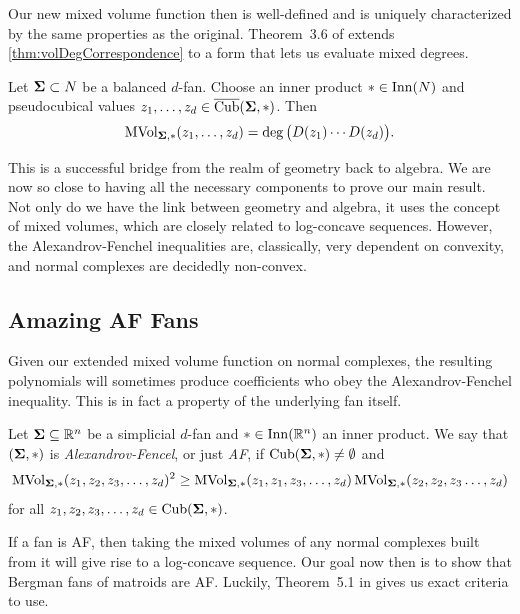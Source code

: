 \documentclass[12pt,oneside]{../../sfsuthesis}
\begin{document}
Our new mixed volume function then is well-defined and is uniquely characterized by the same properties as the original.
Theorem~3.6 of \cite{nowakMixedVolumesNormal2023} extends \th\ref{thm:volDegCorrespondence} to a form that lets us evaluate mixed degrees.
\begin{theorem}\th\label{thm:mixedDeg}
    Let \( \bm{\Sigma} \subset N \) be a balanced \( d \)-fan.
    Choose an inner product \( \ast \in \operatorname{Inn}(N) \) and pseudocubical values \( z_1, \dots, z_d \in \operatorname{\overline{Cub}}( \bm{\Sigma}, \ast ) \).
    Then
    \[
        \operatorname{MVol}_{\bm{\Sigma}, \ast}(z_1, \dots, z_d) = \deg\big( D(z_1) \cdots D(z_d) \big).
    \]
\end{theorem}
This is a successful bridge from the realm of geometry back to algebra.
We are now so close to having all the necessary components to prove our main result.
Not only do we have the link between geometry and algebra, it uses the concept of mixed volumes, which are closely related to log-concave sequences.
However, the Alexandrov-Fenchel inequalities are, classically, very dependent on convexity, and normal complexes are decidedly non-convex.

\subsection{Amazing AF Fans}
Given our extended mixed volume function on normal complexes, the resulting polynomials will sometimes produce coefficients who obey the Alexandrov-Fenchel inequality.
This is in fact a property of the underlying fan itself.
\begin{definition}\th\label{def:AF}
    Let \( \bm{\Sigma} \subseteq \mathbb{R}^n \) be a simplicial \( d \)-fan and \( \ast \in \operatorname{Inn}(\mathbb{R}^n) \) an inner product.
    We say that \( (\bm{\Sigma}, \ast) \) is \emph{Alexandrov-Fencel}, or just \emph{AF}, if \( \operatorname{Cub}(\bm{\Sigma}, \ast) \neq \emptyset \) and
    \[
        \operatorname{MVol}_{\bm{\Sigma}, \ast}(z_1, z_2, z_3, \dots, z_d)^2 \geq  \operatorname{MVol}_{\bm{\Sigma}, \ast}(z_1, z_1, z_3, \dots, z_d)\operatorname{MVol}_{\bm{\Sigma}, \ast}(z_2, z_2, z_3 \dots, z_d)
    \]
    for all \( z_1, z_2, z_3, \dots, z_d \in \operatorname{Cub}(\bm{\Sigma}, \ast) \).
\end{definition}
If a fan is AF, then taking the mixed volumes of any normal complexes built from it will give rise to a log-concave sequence.
Our goal now then is to show that Bergman fans of matroids are AF\@.
Luckily, Theorem~5.1 in \cite{nowakMixedVolumesNormal2023} gives us exact criteria to use.
\end{document}
